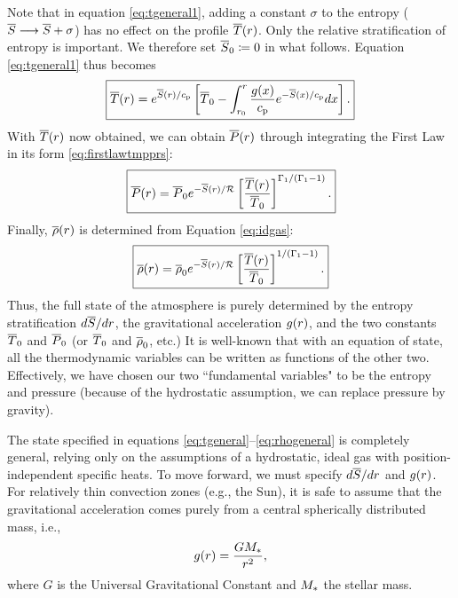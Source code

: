 \documentclass[12pt]{article} %
\begin{document}
	Note that in equation \eqref{eq:tgeneral1}, adding a constant $\sigma$ to the entropy ($\overline{S}\longrightarrow \overline{S}+\sigma$) has no effect on the profile $\overline{T}(r)$. Only the relative stratification of entropy is important. We therefore set $\overline{S}_0\coloneqq0$ in what follows. Equation \eqref{eq:tgeneral1} thus becomes
		\begin{align}
		\boxed{
			\overline{T}(r) = e^{\overline{S}(r)/c_{\rm{p}}}\left[\overline{T}_0-\int_{r_0}^r \frac{g(x)}{c_{\rm{p}}}e^{-\overline{S}(x)/c_{\rm{p}}}dx \right].
			\label{eq:tgeneral}}
	\end{align}
	With $\overline{T}(r)$ now obtained, we can obtain $\overline{P}(r)$ through integrating the First Law in its form \eqref{eq:firstlawtmpprs}:
	\begin{align}
	\boxed{
	\overline{P}(r)=\overline{P}_0e^{-\overline{S}(r)/\mathcal{R}} \left[\frac{\overline{T}(r)}{\overline{T}_0}\right]^{\Gamma_1/(\Gamma_1 - 1)}.
}
\label{eq:pgeneral}
	\end{align}
	Finally, $\overline{\rho}(r)$ is determined from Equation \eqref{eq:idgas}:
	\begin{align}
	\boxed{
	\overline{\rho}(r)=\overline{\rho}_0e^{-\overline{S}(r)/\mathcal{R}} \left[\frac{\overline{T}(r)}{\overline{T}_0}\right]^{1/(\Gamma_1 - 1)}.
}
\label{eq:rhogeneral}
	\end{align}
	Thus, the full state of the atmosphere is purely determined by the entropy stratification $d\overline{S}/dr$, the gravitational acceleration $g(r)$, and the two constants $\overline{T}_0$ and $\overline{P}_0$ (or $\overline{T}_0$ and $\overline{\rho}_0$, etc.) It is well-known that with an equation of state, all the thermodynamic variables can be written as functions of the other two. Effectively, we have chosen our two ``fundamental variables" to be the entropy and pressure (because of the hydrostatic assumption, we can replace pressure by gravity). 
	
	The state specified in equations \eqref{eq:tgeneral}--\eqref{eq:rhogeneral} is completely general, relying only on the assumptions of a hydrostatic, ideal gas with position-independent specific heats. To move forward, we must specify $d\overline{S}/dr$ and $g(r)$. For relatively thin convection zones (e.g., the Sun), it is safe to assume that the gravitational acceleration comes purely from a central spherically distributed mass, i.e., 
	\begin{align}
	g(r)=\frac{GM_*}{r^2},
	\label{eq:gpointmass}
	\end{align}
	where $G$ is the Universal Gravitational Constant and $M_*$ the stellar mass. 
\end{document}
